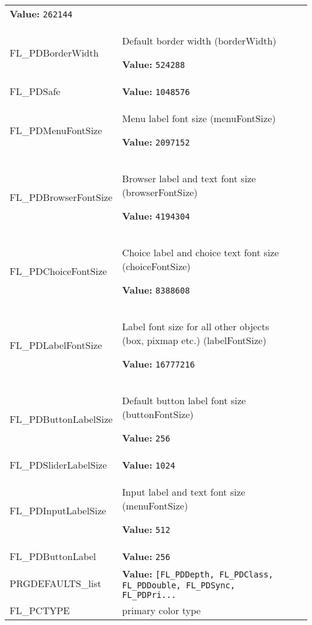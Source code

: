 \begin{longtable}{|p{\varnamewidth}|p{\vardescrwidth}|l}
\textbf{Value:} 
{\tt 262144}&\\
\cline{1-2}
\raggedright F\-L\-\_\-P\-D\-B\-o\-r\-d\-e\-r\-W\-i\-d\-t\-h\- & \raggedright Default border width (borderWidth)

\textbf{Value:} 
{\tt 524288}&\\
\cline{1-2}
\raggedright F\-L\-\_\-P\-D\-S\-a\-f\-e\- & \raggedright \textbf{Value:} 
{\tt 1048576}&\\
\cline{1-2}
\raggedright F\-L\-\_\-P\-D\-M\-e\-n\-u\-F\-o\-n\-t\-S\-i\-z\-e\- & \raggedright Menu label font size (menuFontSize)

\textbf{Value:} 
{\tt 2097152}&\\
\cline{1-2}
\raggedright F\-L\-\_\-P\-D\-B\-r\-o\-w\-s\-e\-r\-F\-o\-n\-t\-S\-i\-z\-e\- & \raggedright Browser label and text font size (browserFontSize)

\textbf{Value:} 
{\tt 4194304}&\\
\cline{1-2}
\raggedright F\-L\-\_\-P\-D\-C\-h\-o\-i\-c\-e\-F\-o\-n\-t\-S\-i\-z\-e\- & \raggedright Choice label and choice text font size (choiceFontSize)

\textbf{Value:} 
{\tt 8388608}&\\
\cline{1-2}
\raggedright F\-L\-\_\-P\-D\-L\-a\-b\-e\-l\-F\-o\-n\-t\-S\-i\-z\-e\- & \raggedright Label font size for all other objects (box, pixmap etc.) (labelFontSize)

\textbf{Value:} 
{\tt 16777216}&\\
\cline{1-2}
\raggedright F\-L\-\_\-P\-D\-B\-u\-t\-t\-o\-n\-L\-a\-b\-e\-l\-S\-i\-z\-e\- & \raggedright Default button label font size (buttonFontSize)

\textbf{Value:} 
{\tt 256}&\\
\cline{1-2}
\raggedright F\-L\-\_\-P\-D\-S\-l\-i\-d\-e\-r\-L\-a\-b\-e\-l\-S\-i\-z\-e\- & \raggedright \textbf{Value:} 
{\tt 1024}&\\
\cline{1-2}
\raggedright F\-L\-\_\-P\-D\-I\-n\-p\-u\-t\-L\-a\-b\-e\-l\-S\-i\-z\-e\- & \raggedright Input label and text font size (menuFontSize)

\textbf{Value:} 
{\tt 512}&\\
\cline{1-2}
\raggedright F\-L\-\_\-P\-D\-B\-u\-t\-t\-o\-n\-L\-a\-b\-e\-l\- & \raggedright \textbf{Value:} 
{\tt 256}&\\
\cline{1-2}
\raggedright P\-R\-G\-D\-E\-F\-A\-U\-L\-T\-S\-\_\-l\-i\-s\-t\- & \raggedright \textbf{Value:} 
{\tt [FL\_PDDepth, FL\_PDClass, FL\_PDDouble, FL\_PDSync, FL\_PDPri\texttt{...}}&\\
\cline{1-2}
\raggedright F\-L\-\_\-P\-C\-T\-Y\-P\-E\- & \raggedright primary color type


\end{longtable}
